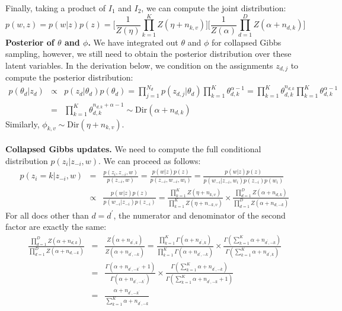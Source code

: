 Finally, taking a product of $I_1$ and $I_2$, we can compute the joint distribution:
\begin{equation}
    p(w, z) = p(w|z)p(z) = \bigg[\frac{1}{Z(\eta)}\prod_{k=1}^{K}Z(\eta + n_{k,v})\bigg] \bigg[\frac{1}{Z(\alpha)}\prod_{d=1}^{D}Z(\alpha + n_{d,k})\bigg]
\end{equation}
\textbf{Posterior of $\theta$ and $\phi$.}\newline
We have integrated out $\theta$ and $\phi$ for collapsed Gibbs sampling, however, we still need to obtain the posterior distribution over these latent variables. In the derivation below, we condition on the assignments $z_{d,j}$ to compute the posterior distribution:
\begin{eqnarray}
    p(\theta_d|z_d) &\propto& p(z_d|\theta_d)p(\theta_d) = \prod_{j=1}^{N_d}p(z_{d,j}|\theta_d)\prod_{k=1}^{K}\theta_{d,k}^{\alpha - 1} = \prod_{k=1}^{K}\theta_{d,k}^{n_{d,k}}\prod_{k=1}^{K}\theta_{d,k}^{\alpha - 1} \nonumber \\
    &=& \prod_{k=1}^{K}\theta_{d,k}^{n_{d,k}+\alpha - 1} \sim \mathrm{Dir}(\alpha + n_{d,k})
\end{eqnarray}
Similarly, $\phi_{k,v} \sim \mathrm{Dir}(\eta + n_{k,v})$.\\\\
\textbf{Collapsed Gibbs updates.}\newline
We need to compute the full conditional distribution $p(z_i|z_{-i}, w)$. We can proceed as follows:
\begin{eqnarray}
    p(z_i=k|z_{-i}, w) &=& \frac{p(z_i, z_{-i}, w)}{p(z_{-i}, w)} = \frac{p(w|z)p(z)}{p(z_{-i}, w_{-i}, w_i)} = \frac{p(w|z)p(z)}{p(w_{-i}|z_{-i},w_i)p(z_{-i})p(w_i)} \nonumber \\
    &\propto& \frac{p(w|z)p(z)}{p(w_{-i}|z_{-i})p(z_{-i})} = \frac{\prod_{k=1}^{K}Z(\eta + n_{k,v})}{\prod_{k=1}^{K}Z(\eta + n_{-k,v})} \times \frac{\prod_{d=1}^{D}Z(\alpha + n_{d,k})}{\prod_{d=1}^{D}Z(\alpha + n_{d,-k})}
\end{eqnarray}
For all docs other than $d=d^{\prime}$, the numerator and denominator of the second factor are exactly the same:
\begin{eqnarray}
     \frac{\prod_{d=1}^{D}Z(\alpha + n_{d,k})}{\prod_{d=1}^{D}Z(\alpha + n_{d,-k})} &=& \frac{Z(\alpha + n_{d^{\prime}, k})}{Z(\alpha + n_{d^{\prime}, -k})} = \frac{\prod_{k=1}^{K}\Gamma(\alpha + n_{d^{\prime}, k})}{\prod_{k=1}^{K}\Gamma(\alpha + n_{d^{\prime}, -k})} \times \frac{\Gamma(\sum_{k=1}^{K}\alpha + n_{d^{\prime},-k})}{\Gamma(\sum_{k=1}^{K}\alpha + n_{d^{\prime}, k})} \nonumber \\\ &=& \frac{\Gamma(\alpha + n_{d^{\prime}, -k^{\prime}} + 1)}{\Gamma(\alpha + n_{d^{\prime}, -k^{\prime}})} \times \frac{\Gamma(\sum_{k=1}^{K}\alpha + n_{d^{\prime},-k})}{\Gamma(\sum_{k=1}^{K}\alpha + n_{d^{\prime}, -k} + 1)} \nonumber \\
   &=& \frac{\alpha + n_{d^{\prime}, -k^{\prime}}}{\sum_{k=1}^{K}\alpha + n_{d^{\prime},-k}}
\end{eqnarray}
